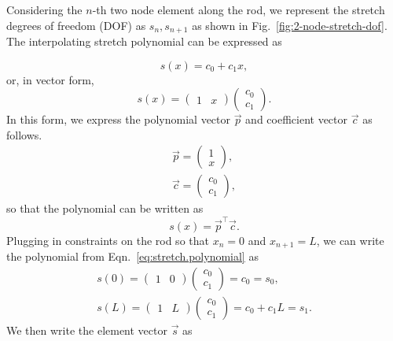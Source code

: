 Considering the $n$-th two node element along the rod, we represent the stretch degrees of freedom (DOF) as $s_n,s_{n+1}$ as shown in Fig.~\ref{fig:2-node-stretch-dof}. The interpolating stretch polynomial can be expressed as 

\begin{equation}
s(x) = c_0 + c_1x,
\label{eq:stretch.polynomial}
\end{equation}
or, in vector form,
\begin{equation}
s(x) = 
\begin{pmatrix}
1 & x
\end{pmatrix}
\begin{pmatrix}
c_0 \\
c_1
\end{pmatrix}.
\end{equation}
In this form, we express the polynomial vector $\vec p$ and coefficient vector $\vec c$ as follows.
\begin{eqnarray}
\vec{p} =
\begin{pmatrix}
1 \\
x
\end{pmatrix}, \\
\vec{c} = 
\begin{pmatrix}
c_0 \\
c_1
\end{pmatrix},
\end{eqnarray}
so that the polynomial can be written as
\begin{equation}
s(x) = \vec{p}^\top\vec{c}.
\label{eq:stretch.polynomial.vector}
\end{equation}
Plugging in constraints on the rod so that $x_n=0$ and $x_{n+1}=L$, we can write the polynomial from Eqn.~\ref{eq:stretch.polynomial} as
\begin{eqnarray}
s(0) = 
\begin{pmatrix}
1 & 0
\end{pmatrix}
\begin{pmatrix}
c_0 \\
c_1
\end{pmatrix}
= c_0 = s_0,\\
s(L) = 
\begin{pmatrix}
1 & L
\end{pmatrix}
\begin{pmatrix}
c_0 \\
c_1
\end{pmatrix}
= c_0 + c_1L = s_1.
\end{eqnarray}
We then write the element vector $\vec s$ as
